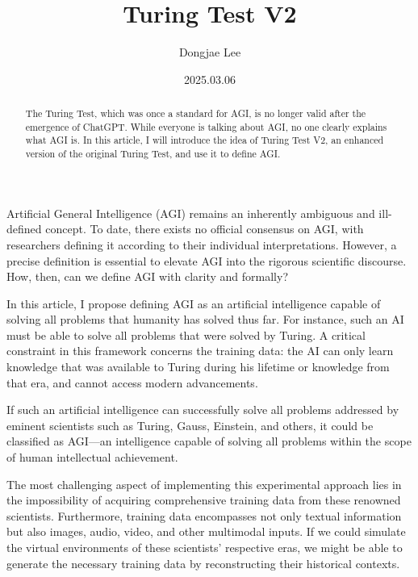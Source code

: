 \documentclass[11pt, oneside]{article}   	%
\title{Turing Test V2}
\author{Dongjae Lee}
\date{2025.03.06}
\begin{document}
\maketitle


\begin{abstract}
  The Turing Test, which was once a standard for AGI, is no longer valid after the emergence of ChatGPT.
  While everyone is talking about AGI, no one clearly explains what AGI is.
  In this article, I will introduce the idea of Turing Test V2, an enhanced version of the original Turing Test, and use it to define AGI.
\end{abstract}
  Artificial General Intelligence (AGI) remains an inherently ambiguous and ill-defined concept. To date, there exists no official consensus on AGI, with researchers defining it according to their individual interpretations. However, a precise definition is essential to elevate AGI into the rigorous scientific discourse. How, then, can we define AGI with clarity and formally?

  In this article, I propose defining AGI as an artificial intelligence capable of solving all problems that humanity has solved thus far. For instance, such an AI must be able to solve all problems that were solved by Turing. A critical constraint in this framework concerns the training data: the AI can only learn knowledge that was available to Turing during his lifetime or knowledge from that era, and cannot access modern advancements.

  If such an artificial intelligence can successfully solve all problems addressed by eminent scientists such as Turing, Gauss, Einstein, and others, it could be classified as AGI—an intelligence capable of solving all problems within the scope of human intellectual achievement.

  The most challenging aspect of implementing this experimental approach lies in the impossibility of acquiring comprehensive training data from these renowned scientists. Furthermore, training data encompasses not only textual information but also images, audio, video, and other multimodal inputs. If we could simulate the virtual environments of these scientists' respective eras, we might be able to generate the necessary training data by reconstructing their historical contexts.
\end{document}
